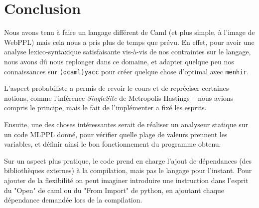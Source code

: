 \documentclass[svgnames]{article}
\begin{document}

 

\section{Conclusion}
 

Nous avons tenu à faire un langage différent de Caml (et plus simple, à l'image de WebPPL) mais cela nous a pris plus de temps que prévu. En effet, pour avoir une analyse lexico-syntaxique satisfaisante vis-à-vis de nos contraintes sur le langage, nous avons dû nous replonger dans ce domaine, et adapter quelque peu nos connaissances sur  \verb|(ocaml)yacc| pour créer quelque chose d'optimal avec \verb|menhir|.

L'aspect probabiliste a permis de revoir le cours et de repréciser certaines notions, comme l'inférence \emph{SingleSite} de Metropolis-Hastings -- nous avions compris le principe, mais le fait de l'implémenter a fixé les esprits.

\bigskip

Ensuite, une des choses intéressantes serait de réaliser un analyseur statique sur un code MLPPL donné, pour vérifier quelle plage de valeurs prennent les variables, et définir ainsi le bon fonctionnement du programme obtenu.

Sur un aspect plus pratique, le code prend en charge l'ajout de dépendances (des bibliothèques externes) à la compilation, mais pas le langage pour l'instant. Pour ajouter de la flexibilité on peut imaginer introduire une instruction dans l'esprit du "Open" de caml ou du "From Import" de python, en ajoutant chaque dépendance demandée lors de la compilation.
\end{document}
